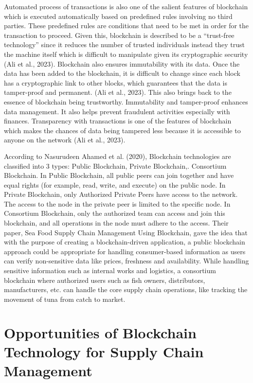 Automated process of transactions is also one of the salient features of blockchain which is executed automatically based on predefined rules involving no third parties. These predefined rules are conditions that need to be met in order for the transaction to proceed. Given this, blockchain is described to be a “trust-free technology” since it reduces the number of trusted individuals instead they trust the machine itself which is difficult to manipulate given its cryptographic security (Ali et al., 2023). Blockchain also ensures immutability with its data. Once the data has been added to the blockchain, it is difficult to change since each block has a cryptographic link to other blocks, which guarantees that the data is tamper-proof and permanent. (Ali et al., 2023). This also brings back to the essence of blockchain being trustworthy. Immutability and tamper-proof enhances data management. It also helps prevent fraudulent activities especially with finances. Transparency with transactions is one of the features of blockchain which makes the chances of data being tampered less because it is accessible to anyone on the network (Ali et al., 2023).

According to Nasurudeen Ahamed et al. (2020), Blockchain technologies are classified into 3 types: Public Blockchain, Private Blockchain,. Consortium Blockchain. In Public Blockchain, all public peers can join together and have equal rights (for example, read, write, and execute) on the public node. In Private Blockchain, only Authorized Private Peers have access to the network. The access to the node in the private peer is limited to the specific node. In Consortium Blockchain, only the authorized team can access and join this blockchain, and all operations in the node must adhere to the access. Their paper, Sea Food Supply Chain Management Using Blockchain, gave the idea that with the purpose of creating a blockchain-driven application, a public blockchain approach could be appropriate for handling consumer-based information as users can verify non-sensitive data like prices, freshness and availability. While handling sensitive information such as internal works and logistics, a consortium blockchain where authorized users such as fish owners, distributors, manufacturers, etc. can handle the core supply chain operations, like tracking the movement of tuna from catch to market.


\section{Opportunities of Blockchain Technology for Supply Chain Management}

